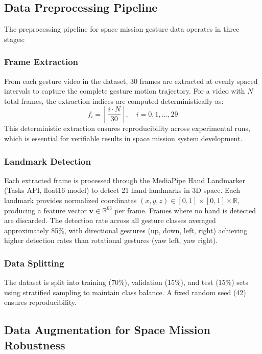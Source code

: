 \documentclass[conference]{IEEEtran}
\begin{document}
\subsection{Data Preprocessing Pipeline}

The preprocessing pipeline for space mission gesture data operates in three stages:

\subsubsection{Frame Extraction}
From each gesture video in the dataset, 30 frames are extracted at evenly spaced intervals to capture the complete gesture motion trajectory. For a video with $N$ total frames, the extraction indices are computed deterministically as:
\begin{equation}
    f_i = \left\lfloor \frac{i \cdot N}{30} \right\rfloor, \quad i = 0, 1, \ldots, 29
\end{equation}
This deterministic extraction ensures reproducibility across experimental runs, which is essential for verifiable results in space mission system development.

\subsubsection{Landmark Detection}
Each extracted frame is processed through the MediaPipe Hand Landmarker (Tasks API, float16 model) to detect 21 hand landmarks in 3D space. Each landmark provides normalized coordinates $(x, y, z) \in [0,1] \times [0,1] \times \mathbb{R}$, producing a feature vector $\mathbf{v} \in \mathbb{R}^{63}$ per frame. Frames where no hand is detected are discarded. The detection rate across all gesture classes averaged approximately 85\%, with directional gestures (up, down, left, right) achieving higher detection rates than rotational gestures (yaw left, yaw right).

\subsubsection{Data Splitting}
The dataset is split into training (70\%), validation (15\%), and test (15\%) sets using stratified sampling to maintain class balance. A fixed random seed (42) ensures reproducibility.

\subsection{Data Augmentation for Space Mission Robustness}
\end{document}
